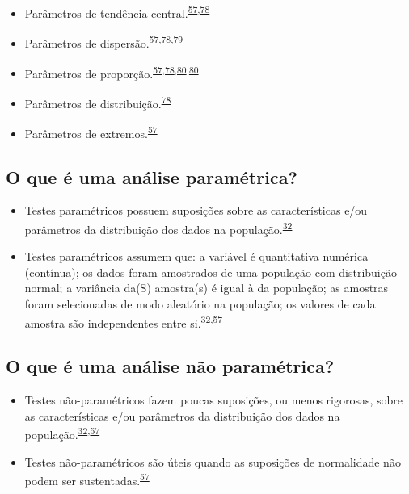 \documentclass[
  a4paper,
]{book}
\begin{document}
\begin{itemize}
\item
  Parâmetros de tendência central.\textsuperscript{\protect\hyperlink{ref-Ali2016}{57},\protect\hyperlink{ref-kanji2006}{78}}
\item
  Parâmetros de dispersão.\textsuperscript{\protect\hyperlink{ref-Ali2016}{57},\protect\hyperlink{ref-kanji2006}{78},\protect\hyperlink{ref-Curran-Everett2008}{79}}
\item
  Parâmetros de proporção.\textsuperscript{\protect\hyperlink{ref-Ali2016}{57},\protect\hyperlink{ref-kanji2006}{78},\protect\hyperlink{ref-Altman1994}{80},\protect\hyperlink{ref-Altman1994}{80}}
\item
  Parâmetros de distribuição.\textsuperscript{\protect\hyperlink{ref-kanji2006}{78}}
\item
  Parâmetros de extremos.\textsuperscript{\protect\hyperlink{ref-Ali2016}{57}}
\end{itemize}

\hypertarget{o-que-uxe9-uma-anuxe1lise-paramuxe9trica}{%
\subsection{O que é uma análise paramétrica?}\label{o-que-uxe9-uma-anuxe1lise-paramuxe9trica}}

\begin{itemize}
\item
  Testes paramétricos possuem suposições sobre as características e/ou parâmetros da distribuição dos dados na população.\textsuperscript{\protect\hyperlink{ref-vetter2017}{32}}
\item
  Testes paramétricos assumem que: a variável é quantitativa numérica (contínua); os dados foram amostrados de uma população com distribuição normal; a variância da(S) amostra(s) é igual à da população; as amostras foram selecionadas de modo aleatório na população; os valores de cada amostra são independentes entre si.\textsuperscript{\protect\hyperlink{ref-vetter2017}{32},\protect\hyperlink{ref-Ali2016}{57}}
\end{itemize}

\hypertarget{o-que-uxe9-uma-anuxe1lise-nuxe3o-paramuxe9trica}{%
\subsection{O que é uma análise não paramétrica?}\label{o-que-uxe9-uma-anuxe1lise-nuxe3o-paramuxe9trica}}

\begin{itemize}
\item
  Testes não-paramétricos fazem poucas suposições, ou menos rigorosas, sobre as características e/ou parâmetros da distribuição dos dados na população.\textsuperscript{\protect\hyperlink{ref-vetter2017}{32},\protect\hyperlink{ref-Ali2016}{57}}
\item
  Testes não-paramétricos são úteis quando as suposições de normalidade não podem ser sustentadas.\textsuperscript{\protect\hyperlink{ref-Ali2016}{57}}
\end{itemize}
\end{document}
